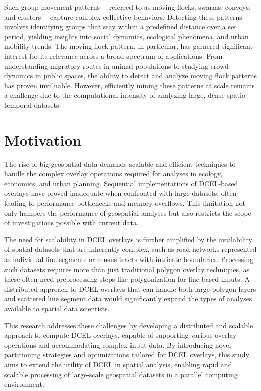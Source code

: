 Such group movement patterns —referred to as moving flocks, swarms, convoys, and clusters— capture complex collective behaviors. Detecting these patterns 
involves identifying groups that stay within a predefined distance over a set period, yielding insights into social dynamics, ecological phenomena, and urban 
mobility trends. The moving flock pattern, in particular, has garnered significant interest for its relevance across a broad spectrum of applications. From 
understanding migratory routes in animal populations to studying crowd dynamics in public spaces, the ability to detect and analyze moving flock patterns has 
proven invaluable. However, efficiently mining these patterns at scale remains a challenge due to the computational intensity of analyzing large, dense 
spatio-temporal datasets.

\section{Motivation}
The rise of big geospatial data demands scalable and efficient techniques to handle the complex overlay operations required for analyses in ecology, economics, and urban planning. Sequential implementations of DCEL-based overlays have proved inadequate when confronted with large datasets, often leading to performance bottlenecks and memory overflows. This limitation not only hampers the performance of geospatial analyses but also restricts the scope of investigations possible with current data.

The need for scalability in DCEL overlays is further amplified by the availability of spatial datasets that are inherently complex, such as road networks represented as individual line segments or census tracts with intricate boundaries. Processing such datasets requires more than just traditional polygon overlay techniques, as these often need preprocessing steps like polygonization for line-based inputs. A distributed approach to DCEL overlays that can handle both large polygon layers and scattered line segment data would significantly expand the types of analyses available to spatial data scientists.

This research addresses these challenges by developing a distributed and scalable approach to compute DCEL overlays, capable of supporting various overlay operations and accommodating complex input data. By introducing novel partitioning strategies and optimizations tailored for DCEL overlays, this study aims to extend the utility of DCEL in spatial analysis, enabling rapid and scalable processing of large-scale geospatial datasets in a parallel computing environment.

